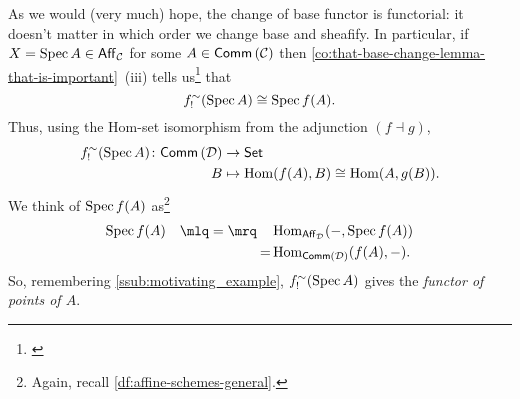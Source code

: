 

    
    As we would (very much) hope, the change of base functor is functorial: it doesn't matter in which order we change base and sheafify.
    In particular, if $X=\operatorname{Spec} A\in\mathsf{Aff}_{\mathcal{C}}$ for some $A\in\mathsf{Comm}\left({\mathcal{C}}\right)$ then \cref{co:that-base-change-lemma-that-is-important}~(iii) tells us\footnote{
        \cite[\S2.5,~\P-1]{Toen:2005wxa}
    } that
    \begin{equation*}
        f_!^\sim(\operatorname{Spec} A)\cong\operatorname{Spec} f(A).
    \end{equation*}
    Thus, using the Hom-set isomorphism from the adjunction $(f\dashv g)$,
    \begin{align*}
        f_!^\sim(\operatorname{Spec} A)\colon\mathsf{Comm}\left({\mathcal{D}}\right)&\to\mathsf{Set}\\
        B&\mapsto\operatorname{Hom}(f(A),B)\cong\operatorname{Hom}(A,g(B)).
    \end{align*}
    We think of $\operatorname{Spec} f(A)$ as\footnote{
        Again, recall \cref{df:affine-schemes-general}.
    }
    \begin{align*}
        \spec f(A) \quad\mlq=\mrq\quad &\Hom_{\aff{\dcat}}(\blank,\spec f(A))\\
        =&\Hom_{\comm{\dcat}}(f(A),\blank).
    \end{align*}
    So, remembering \cref{ssub:motivating_example}, $f_!^\sim(\operatorname{Spec} A)$ gives the \emph{functor of points of $A$}.


